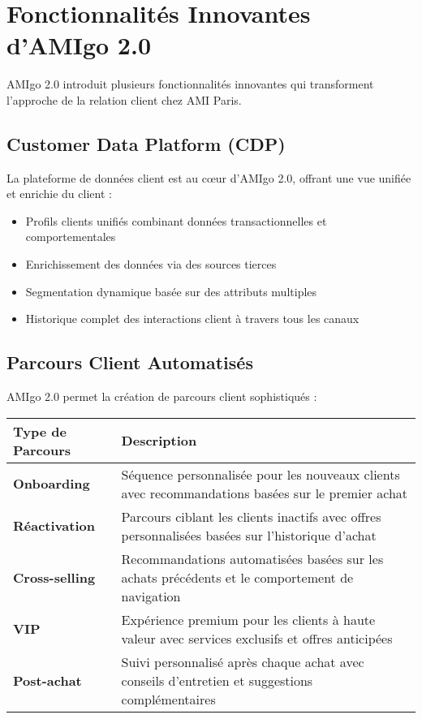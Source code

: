 \section{Fonctionnalités Innovantes d'AMIgo 2.0}

AMIgo 2.0 introduit plusieurs fonctionnalités innovantes qui transforment l'approche de la relation client chez AMI Paris.

\subsection{Customer Data Platform (CDP)}

La plateforme de données client est au cœur d'AMIgo 2.0, offrant une vue unifiée et enrichie du client :

\begin{itemize}
    \item Profils clients unifiés combinant données transactionnelles et comportementales
    \item Enrichissement des données via des sources tierces
    \item Segmentation dynamique basée sur des attributs multiples
    \item Historique complet des interactions client à travers tous les canaux
\end{itemize}

\subsection{Parcours Client Automatisés}

AMIgo 2.0 permet la création de parcours client sophistiqués :

\begin{center}
\begin{tabular}{|>{\bfseries}p{4cm}|p{9.5cm}|}
\hline
\rowcolor{lightblue} Type de Parcours & Description \\
\hline
Onboarding & Séquence personnalisée pour les nouveaux clients avec recommandations basées sur le premier achat \\
\hline
Réactivation & Parcours ciblant les clients inactifs avec offres personnalisées basées sur l'historique d'achat \\
\hline
Cross-selling & Recommandations automatisées basées sur les achats précédents et le comportement de navigation \\
\hline
VIP & Expérience premium pour les clients à haute valeur avec services exclusifs et offres anticipées \\
\hline
Post-achat & Suivi personnalisé après chaque achat avec conseils d'entretien et suggestions complémentaires \\
\hline
\end{tabular}
\end{center}

